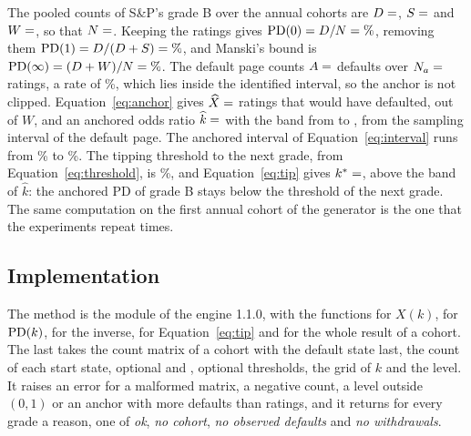 The pooled counts of S\&P's grade B over the  annual cohorts are $D=\nv{real.sp.B.D}$, $S=\nv{real.sp.B.S}$ and $W=\nv{real.sp.B.W}$, so that $N=\nv{real.sp.B.N}$. Keeping the \wdn{} ratings gives $\pdk(0)=D/N=\nv{real.sp.B.pd0}\%$, removing them $\pdk(1)=D/(D+S)=\nv{real.sp.B.pdind}\%$, and Manski's bound is $\pdk(\infty)=(D+W)/N=\nv{real.sp.B.manski}\%$. The default page counts $A=\nv{real.sp.B.A}$ defaults over $N_a=\nv{real.sp.B.Na}$ ratings, a rate of \%, which lies inside the identified interval, so the anchor is not clipped. Equation~\eqref{eq:anchor} gives $\widehat X=\nv{real.sp.B.ximp}$ \wdn{} ratings that would have defaulted, out of $W$, and an anchored odds ratio $\widehat k=\nv{real.sp.B.k}$ with the band from  to , from the sampling interval of the default page. The anchored interval of Equation~\eqref{eq:interval} runs from \% to \%. The tipping threshold to the next grade, from Equation~\eqref{eq:threshold}, is \%, and Equation~\eqref{eq:tip} gives $\tip=\nv{real.sp.B.tip}$, above the band of $\widehat k$: the anchored PD of grade B stays below the threshold of the next grade. The same computation on the first annual cohort of the generator is the one that the experiments repeat  times.

\subsection{Implementation}

The method is the module  of the engine  1.1.0, with the functions  for $X(k)$,  for $\mathrm{PD}(k)$,  for the inverse,  for Equation~\eqref{eq:tip} and  for the whole result of a cohort. The last takes the count matrix of a cohort with the default state last, the \wdn{} count of each start state, optional  and , optional thresholds, the grid of $k$ and the level. It raises an error for a malformed matrix, a negative count, a level outside $(0,1)$ or an anchor with more defaults than ratings, and it returns for every grade a reason, one of \emph{ok}, \emph{no cohort}, \emph{no observed defaults} and \emph{no withdrawals}.

